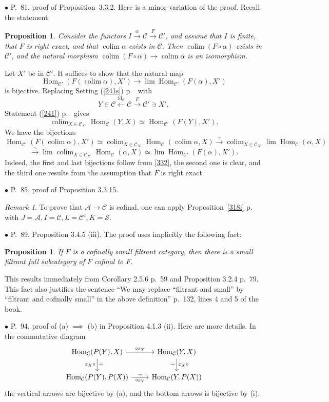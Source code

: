 \documentclass[12pt]{article}
\newtheorem{prop}[thm]{Proposition}
\theoremstyle{remark}%
\newtheorem{rk}[thm]{Remark}%
\newcommand{\bu}{\bullet}
\newcommand{\n}{\noindent}
\newcommand{\cc}{\mathcal}
\newcommand{\A}{\mathcal A}
\newcommand{\C}{\mathcal C}
\newcommand{\e}{\varepsilon}
\newcommand{\xr}{\xrightarrow}
\newcommand{\be}{\begin{equation}}
\newcommand{\ee}{\end{equation}}
\newcommand{\pr}{Proposition}
\DeclareMathOperator*{\co}{colim}
\DeclareMathOperator{\id}{id}
\DeclareMathOperator{\h}{Hom}
\begin{document}
\n$\bu$ P.~81, proof of \pr\ 3.3.2. Here is a minor variation of the proof. Recall the statement: 
% 
\begin{prop} 
% 
Consider the functors $I\xrightarrow\alpha\C\xrightarrow F\C'$, and assume that $I$ is finite, that $F$ is right exact, and that $\co\alpha$ exists in $\C$. Then $\co(F\circ\alpha)$ exists in $\C'$, and the natural morphism $\co(F\circ\alpha)\to\co\alpha$ is an isomorphism. 
%
\end{prop} 
% 
\n{\em Proof.} Let $X'$ be in $\C'$. It suffices to show that the natural map  
$$
\h_{\C'}(F(\co\alpha),X')\to\lim\h_{\C'}(F(\alpha),X')
$$ 
% 
is bijective. Replacing Setting (\ref{241s}) p.~\pageref{241s} with 
$$
Y\in\C\xleftarrow{\id_\C}\C\xrightarrow{F}\C'\ni X', 
$$ 
Statement (\ref{241}) p.~\pageref{241} gives 
% 
\be\label{332} 
\co_{X\in\C_{X'}}\h_\C(Y,X)\simeq\h_{\C'}(F(Y),X').  
\ee 
% 
We have the bijections 
$$ 
\h_{\C'}(F(\co\alpha),X')\simeq\co_{X\in\C_{X'}}\h_\C(\co\alpha,X)\xr\sim\co_{X\in\C_{X'}}\lim\h_\C(\alpha,X) 
$$ 
$$
\xr\sim\lim\co_{X\in\C_{X'}}\h_\C(\alpha,X)\simeq\lim\h_{\C'}(F(\alpha),X'). 
$$ 
Indeed, the first and last bijections follow from \eqref{332}, the second one is clear, and the third one results from the assumption that $F$ is right exact. 


\n$\bu$ P.~85, proof of Proposition 3.3.15. 
%
\begin{rk}\label{3315}  
% 
To prove that $\A\to\C$ is cofinal, one can apply \pr\ \ref{318i} p.~\pageref{318i} with $J=\A,I=\C,L=\C',K=\cc S$. 
%
\end{rk} 


\n$\bu$ P.~89, Proposition 3.4.5 (iii). The proof uses implicitly the following fact: 

\begin{prop}\label{355} 
If $F$ is a cofinally small filtrant category, then there is a small {\em filtrant} full subcategory of $F$ cofinal to $F$. 
\end{prop}

This results immediately from Corollary 2.5.6 p.~59 and Proposition 3.2.4 p.~79. This fact also justifies the sentence ``We may replace ``filtrant and small'' by ``filtrant and cofinally small'' in the above definition'' p.~132, lines 4 and 5 of the book.%


\n$\bu$ P.~94, proof of (a) $\implies$ (b) in Proposition 4.1.3 (ii). Here are more details. In the commutative diagram 
$$
\begin{tikzcd}
\h_\C(P(Y),X)\ar{d}{\sim}[swap]{\e_X\circ}\ar{r}{\circ\e_Y}&\h_\C(Y,X)\ar{d}{\e_X\circ}[swap]{\sim}\\ 
\h_\C(P(Y),P(X))\ar{r}[swap]{\circ\e_Y}{\sim}&\h_\C(Y,P(X))
\end{tikzcd}
$$ 
the vertical arrows are bijective by (a), and the bottom arrows is bijective by (i). 
\end{document}
